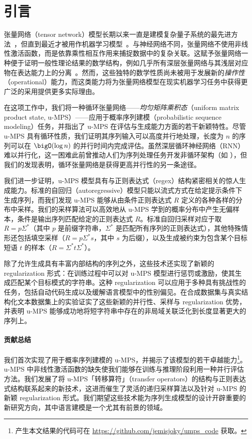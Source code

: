 \section{引言}
\label{sec:intro}

张量网络（tensor network）模型长期以来一直是建模复杂量子系统的最先进方法~\citep{white1992, fannes1992, orus2019}，但直到最近才被用作机器学习模型~\citep{novikov2015, cohen2016, stoudenmire2016, novikov2017, han2018, stoudenmire2018, cheng2019}。与神经网络不同，张量网络不使用非线性激活函数，而是依靠乘性相互作用来捕捉数据中的复杂关联。这赋予张量网络一种便于证明一般性理论结果的数学结构，例如几乎所有深层张量网络与其浅层对应物在表达能力上的分离~\citep{cohen2016}。然而，这些独特的数学性质尚未被用于发展新的\emph{操作性}（operational）能力，而这类能力将为张量网络模型在现实机器学习任务中获得更广泛的采用提供更多实际理由。

在这项工作中，我们将一种循环张量网络——\emph{均匀矩阵乘积态}（uniform matrix product state, u-MPS）——应用于概率序列建模（probabilistic sequence modeling）任务，并指出了 u-MPS 在评估与生成能力方面的若干新颖特性。尽管 u-MPS 具有循环性质，我们证明其序列输入可以高度并行地处理，长度为 $n$ 的序列可以在 $\bigO(\log n)$ 的并行时间内完成评估。虽然深层循环神经网络（RNN）难以并行化，这一困难此前曾推动人们为序列处理任务开发非循环架构（如 \citep{gehring2017, vaswani2017}），但我们的发现表明，循环张量网络是获得更高并行性的另一条途径。

我们进一步证明，u-MPS 模型具有与正则表达式（regex）结构紧密相关的惊人生成能力。标准的自回归（autoregressive）模型只能以流式方式在给定提示条件下生成序列，而我们发现 u-MPS 能够从由条件正则表达式 $R$ 定义的各种各样的分布中采样。我们的采样算法可以高效地从 u-MPS 学到的概率分布中产生无偏样本，条件是输出序列匹配给定的正则表达式 $R$。标准自回归采样对应于取 $R = p\Sigma^*$（其中 $p$ 是前缀字符串，$\Sigma^*$ 是匹配所有序列的正则表达式），其他特殊情形还包括填空采样（$R = p\Sigma^*s$，其中 $s$ 为后缀），以及生成被约束为包含某个目标短语 $t$ 的样本（$R=\Sigma^*t\Sigma^*$）。

除了允许生成具有丰富内部结构的序列之外，这些技术还实现了新颖的 regularization 形式：在训练过程中可以对 u-MPS 模型进行惩罚或激励，使其生成匹配某个目标模式的字符串。这种 regularization 可以应用于多种具有挑战性的任务，包括自动代码生成以及缓解语言模型中的性别偏见。在合成数据集与真实结构化文本数据集上的实验证实了这些新颖的并行性、采样与 regularization 优势，并表明 u-MPS 能够成功地将短字符串中存在的非局域关联泛化到长度显著更大的序列上。

\paragraph{贡献总结}
我们首次实现了用于概率序列建模的 u-MPS，并揭示了该模型的若干卓越能力\footnote{产生本文结果的代码可在 \url{https://github.com/jemisjoky/umps_code} 获取。}。u-MPS 中非线性激活函数的缺失使我们能够在训练与推理阶段利用一种并行评估方法。我们发展了将 u-MPS「转移算符」（transfer operators）的结构与正则表达式结构联系起来的新技术，这进而催生了灵活的递归采样算法以及针对 u-MPS 的新颖 regularization 形式。我们期望这些技术能为序列生成模型的设计开辟重要的新研究方向，其中语言建模是一个尤其有前景的领域。

